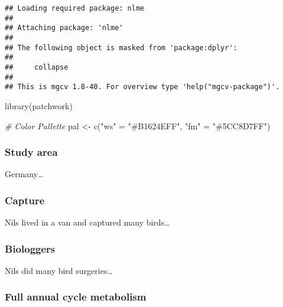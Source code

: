 \documentclass[
]{article}
\newenvironment{Shaded}{\begin{snugshade}}{\end{snugshade}}
\newcommand{\CommentTok}[1]{\textcolor[rgb]{0.56,0.35,0.01}{\textit{#1}}}
\newcommand{\FunctionTok}[1]{\textcolor[rgb]{0.00,0.00,0.00}{#1}}
\newcommand{\NormalTok}[1]{#1}
\newcommand{\OtherTok}[1]{\textcolor[rgb]{0.56,0.35,0.01}{#1}}
\newcommand{\StringTok}[1]{\textcolor[rgb]{0.31,0.60,0.02}{#1}}
\begin{document}
\begin{verbatim}
## Loading required package: nlme
## 
## Attaching package: 'nlme'
## 
## The following object is masked from 'package:dplyr':
## 
##     collapse
## 
## This is mgcv 1.8-40. For overview type 'help("mgcv-package")'.
\end{verbatim}

\begin{Shaded}
\begin{Highlighting}[]
\FunctionTok{library}\NormalTok{(patchwork)}

\CommentTok{\# Color Pallette}
\NormalTok{pal }\OtherTok{\textless{}{-}} \FunctionTok{c}\NormalTok{(}\StringTok{"ws"} \OtherTok{=} \StringTok{"\#B1624EFF"}\NormalTok{, }\StringTok{"fm"} \OtherTok{=} \StringTok{"\#5CC8D7FF"}\NormalTok{) }
\end{Highlighting}
\end{Shaded}

\hypertarget{study-area}{%
\subsubsection{Study area}\label{study-area}}

Germany\ldots{}

\hypertarget{capture}{%
\subsubsection{Capture}\label{capture}}

Nils lived in a van and captured many birds\ldots{}

\hypertarget{biologgers}{%
\subsubsection{Biologgers}\label{biologgers}}

Nils did many bird surgeries\ldots{}

\hypertarget{full-annual-cycle-metabolism}{%
\subsubsection{Full annual cycle
metabolism}\label{full-annual-cycle-metabolism}}
\end{document}
